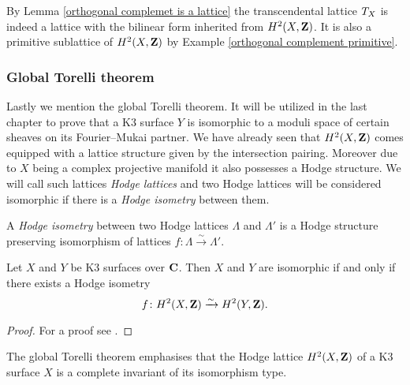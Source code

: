 \begin{remark}
    By Lemma \ref{orthogonal complemet is a lattice} the transcendental lattice $T_{X}$ is indeed a lattice with the bilinear form inherited from $H^{2}(X, \mathbf Z)$. It is also a primitive sublattice of $H^{2}(X, \mathbf Z)$ by Example \ref{orthogonal complement primitive}.
\end{remark}

\subsubsection*{Global Torelli theorem}

Lastly we mention the global Torelli theorem. It will be utilized in the last chapter to prove that a K3 surface $Y$ is isomorphic to a moduli space of certain sheaves on its Fourier--Mukai partner. We have already seen that $H^{2}(X, \mathbf Z)$ comes equipped with a lattice structure given by the intersection pairing. Moreover due to $X$ being a complex projective manifold it also possesses a Hodge structure. We will call such lattices \emph{Hodge lattices} and two Hodge lattices will be considered isomorphic if there is a \emph{Hodge isometry} between them. 

\begin{definition}

    A \emph{Hodge isometry} between two Hodge lattices $\Lambda$ and $\Lambda'$ is a Hodge structure preserving isomorphism of lattices $f \colon \Lambda \xrightarrow{\sim} \Lambda'$.
\end{definition}

\begin{theorem}
    \label{Classical Torelli theorem}
    Let $X$ and $Y$ be K3 surfaces over $\mathbf C$. Then $X$ and $Y$ are isomorphic if and only if there exists a Hodge isometry
    \[
        f\colon H^{2}(X, \mathbf Z) \xrightarrow{\sim} H^{2}(Y, \mathbf Z).
    \]
\end{theorem}

\begin{proof}
    For a proof see \cite[\S 7, Theorem 5.3]{Huybrechts2016}.
\end{proof}

\begin{remark}
    The global Torelli theorem emphasises that the Hodge lattice $H^{2}(X, \mathbf Z)$ of a K3 surface $X$ is a complete invariant of its isomorphism type. 
\end{remark}

